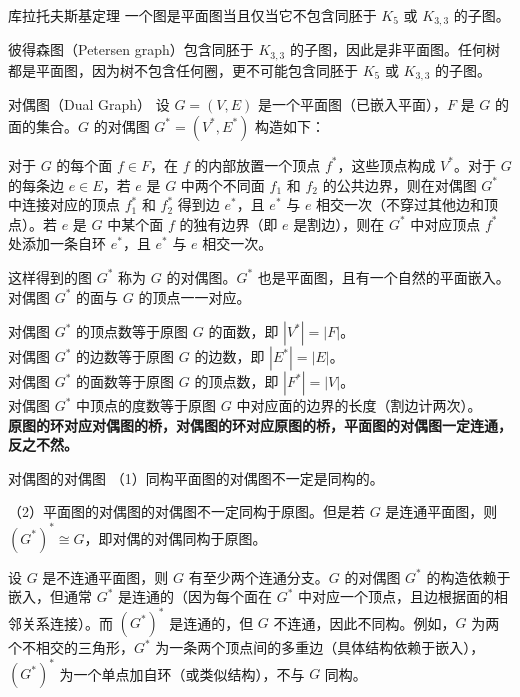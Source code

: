 \documentclass[lang=cn,11pt]{elegantbook}
\begin{document}
\begin{theorem}{库拉托夫斯基定理}
    一个图是平面图当且仅当它不包含同胚于 $K_5$ 或 $K_{3,3}$ 的子图。
\end{theorem}
彼得森图（Petersen graph）包含同胚于 $K_{3,3}$ 的子图，因此是非平面图。任何树都是平面图，因为树不包含任何圈，更不可能包含同胚于 $K_5$ 或 $K_{3,3}$ 的子图。
\begin{definition}{对偶图（Dual Graph）}
设 $G=(V,E)$ 是一个平面图（已嵌入平面），$F$ 是 $G$ 的面的集合。$G$ 的对偶图 $G^*=(V^*,E^*)$ 构造如下：

对于 $G$ 的每个面 $f \in F$，在 $f$ 的内部放置一个顶点 $f^*$，这些顶点构成 $V^*$。对于 $G$ 的每条边 $e \in E$，若 $e$ 是 $G$ 中两个不同面 $f_1$ 和 $f_2$ 的公共边界，则在对偶图 $G^*$ 中连接对应的顶点 $f_1^*$ 和 $f_2^*$ 得到边 $e^*$，且 $e^*$ 与 $e$ 相交一次（不穿过其他边和顶点）。若 $e$ 是 $G$ 中某个面 $f$ 的独有边界（即 $e$ 是割边），则在 $G^*$ 中对应顶点 $f^*$ 处添加一条自环 $e^*$，且 $e^*$ 与 $e$ 相交一次。

这样得到的图 $G^*$ 称为 $G$ 的对偶图。$G^*$ 也是平面图，且有一个自然的平面嵌入。对偶图 $G^*$ 的面与 $G$ 的顶点一一对应。
\end{definition}
对偶图 $G^*$ 的顶点数等于原图 $G$ 的面数，即 $|V^*| = |F|$。\\
对偶图 $G^*$ 的边数等于原图 $G$ 的边数，即 $|E^*| = |E|$。\\
对偶图 $G^*$ 的面数等于原图 $G$ 的顶点数，即 $|F^*| = |V|$。\\
对偶图 $G^*$ 中顶点的度数等于原图 $G$ 中对应面的边界的长度（割边计两次）。\\
\textbf{原图的环对应对偶图的桥，对偶图的环对应原图的桥，平面图的对偶图一定连通，反之不然。}
\begin{theorem}{对偶图的对偶图}
（1）同构平面图的对偶图不一定是同构的。

（2）平面图的对偶图的对偶图不一定同构于原图。但是若 $G$ 是连通平面图，则 $(G^*)^* \cong G$，即对偶的对偶同构于原图。
\end{theorem}
设 $G$ 是不连通平面图，则 $G$ 有至少两个连通分支。$G$ 的对偶图 $G^*$ 的构造依赖于嵌入，但通常 $G^*$ 是连通的（因为每个面在 $G^*$ 中对应一个顶点，且边根据面的相邻关系连接）。而 $(G^*)^*$ 是连通的，但 $G$ 不连通，因此不同构。例如，$G$ 为两个不相交的三角形，$G^*$ 为一条两个顶点间的多重边（具体结构依赖于嵌入），$(G^*)^*$ 为一个单点加自环（或类似结构），不与 $G$ 同构。
\end{document}
